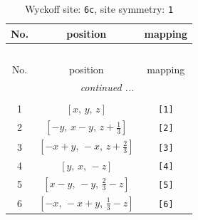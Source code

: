 \documentclass[fleqn,8pt]{jsarticle}
\begin{document}
\renewcommand{\arraystretch}{1.2}
\begin{longtable}{ccc}
\caption{Wyckoff site: {\tt 6c}, site symmetry: {\tt 1}}
 \\
 \hline \hline
No. & position & mapping \\ \hline \endfirsthead

\multicolumn{2}{l}{\tablename\ \thetable{}} \\
 \hline \hline
No. & position & mapping \\ \hline \endhead

 \hline \hline
\multicolumn{2}{r}{\footnotesize\it continued ...} \\ \endfoot

 \hline \hline
\multicolumn{2}{r}{} \\ \endlastfoot

1 & $\left[ x,\, y,\, z \right]$ & {\tt [1]} \\ \hline
2 & $\left[ - y,\, x - y,\, z + \frac{1}{3} \right]$ & {\tt [2]} \\ \hline
3 & $\left[ - x + y,\, - x,\, z + \frac{2}{3} \right]$ & {\tt [3]} \\ \hline
4 & $\left[ y,\, x,\, - z \right]$ & {\tt [4]} \\ \hline
5 & $\left[ x - y,\, - y,\, \frac{2}{3} - z \right]$ & {\tt [5]} \\ \hline
6 & $\left[ - x,\, - x + y,\, \frac{1}{3} - z \right]$ & {\tt [6]} \\
\end{longtable}
\end{document}
